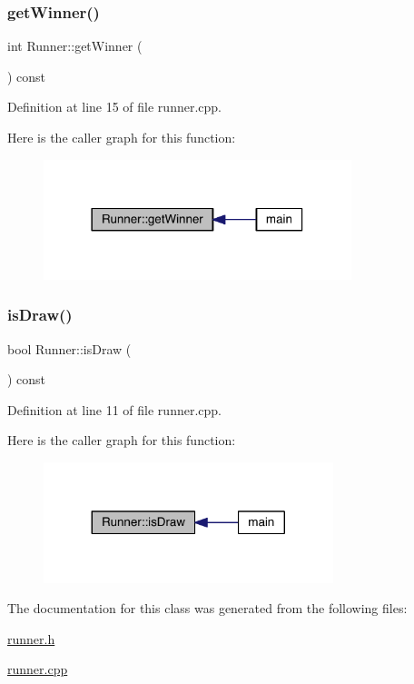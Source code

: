 \subsubsection{\texorpdfstring{get\+Winner()}{getWinner()}}
{\footnotesize\ttfamily int Runner\+::get\+Winner (\begin{DoxyParamCaption}{ }\end{DoxyParamCaption}) const}



Definition at line 15 of file runner.\+cpp.

Here is the caller graph for this function\+:\nopagebreak
\begin{figure}[H]
\begin{center}
\leavevmode
\includegraphics[width=254pt]{class_runner_aa4e55d3ecb77ffc83dfde5dc1fc3663b_icgraph}
\end{center}
\end{figure}
\mbox{\label{class_runner_aa3c82c871ab414550822f993efad22a5}} 
\subsubsection{\texorpdfstring{is\+Draw()}{isDraw()}}
{\footnotesize\ttfamily bool Runner\+::is\+Draw (\begin{DoxyParamCaption}{ }\end{DoxyParamCaption}) const}



Definition at line 11 of file runner.\+cpp.

Here is the caller graph for this function\+:\nopagebreak
\begin{figure}[H]
\begin{center}
\leavevmode
\includegraphics[width=239pt]{class_runner_aa3c82c871ab414550822f993efad22a5_icgraph}
\end{center}
\end{figure}


The documentation for this class was generated from the following files\+:\begin{DoxyCompactItemize}
\item 
\hyperlink{runner_8h}{runner.\+h}\item 
\hyperlink{runner_8cpp}{runner.\+cpp}\end{DoxyCompactItemize}
